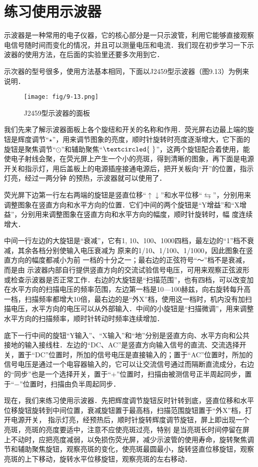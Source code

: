 \section{练习使用示波器}
示波器是一种常用的电子仪器，它的核心部分是一只示波管，利用它能够直接观察电信号随时间而变化的情况，并且可以测量电压和电流．我们现在初步学习一下示波器的使用方法，在后面的实验里还要多次用到它．

示次器的型号很多，使用方法基本相同，下面以J2459型示波器（图9.13）为例来说明．
\begin{figure}[htp]\centering
    \texttt{[image: fig/9-13.png]}
    \caption{J2459型示波器的面板}
    \end{figure}

我们先来了解示波器面板上各个旋纽和开关的名称和作用．荧光屏右边最上端的旋钮是辉度调节“$\star$”，用来调节图象的亮度，顺时针旋转时亮度逐渐增大，它下面的旋钮是聚焦调节“$\odot$”和辅助聚焦“$\textcircled{~}$”，这两个旋钮配合着使用，能使电子射线会聚，在荧光屏上产生一个小的亮斑，得到清晰的图象，再下面是电源开关和指示灯，用后盖板上的电源插座接通电源后，把开关板向“开”的位置，指示灯亮，经过一两分钟
的预热，示波器就可以使用了．

荧光屏下边第一行左右两端的旋钮是竖直位移“$\uparrow\downarrow$”和水平位移“$\leftrightarrows$”，分别用来调整图象在竖直方向和水平方向的位置．它们中间的两个旋钮是“Y增益”和“X增益”，分别用来调整图象在竖直方向和水平方向的幅度，顺时针旋转时，幅
度连续增大．

中间一行左边的大旋钮是“衰减”，它有1, 10、100、1000四档，最左边的“1”档不衰减，其余各档分别使输入电压衰减为
原来的1/10、1/100、1/1000，因此图象在竖直方向的幅度都减小为前
一档的十分之一；最右边的正弦符号“～”档不是衰减，而是由
示波器内部自行提供竖直方向的交流试验信号电压，可用来观察正弦波形或检查示波器是否正常工作．右边的大旋钮是“扫描范围”，也有四档，可以改变加在水平方向的扫描电压的频率范围，左边第一档是10—100赫兹，向右旋转每升高一档，扫描频率都增大10倍，最右边的是“外X”档，使用这一档时，机内没有加扫描电压，水平方向的电压可以从外部输入．中间的小旋钮是“扫描微调”，用来调整水平方向的扫描频率，顺时针转动时频率连续增加．

底下一行中间的旋钮“Y输入”、“X输入”和“地”分别是竖直方向、水平方向和公共接地的输入接线柱．左边的“DC、AC”是竖直方向输入信号的直流、交流选择开关，置于“DC”位置时，所加的信号电压是直接输入的；置于“AC”位置时，所加的信号电压是通过一个电容器输入的，它可以让交流信号通过而隔断直流成分，右边的“同步”也是一个选择开关，置于“$+$”位置时，扫描由被测信号正半周起同步，置于“$-$”位置时，扫描由负半周起同步．

现在，我们来练习使用示波器．先把辉度调节旋钮反时针转到底，竖直位移和水平位移旋钮旋转到中间位置，衰减旋钮置于最高档，扫描范围旋钮置于“外X”档，打开电源开关，
指示灯亮，经预热后，顺时针旋转辉度调节旋钮，屏上即出现一个亮斑，亮斑的亮度要适中，注意不应使亮斑过亮，特别
是当亮斑长时间停留在屏上不动时，应把亮度减弱，以免损伤荧光屏，减少示波管的使用寿命，旋转聚焦调节和辅助聚焦旋钮，观察亮斑的变化，使亮斑最圆最小，旋转竖直位移旋钮，观察亮斑的上下移动，旋转水平位移旋钮，观察亮斑的左右移动．

